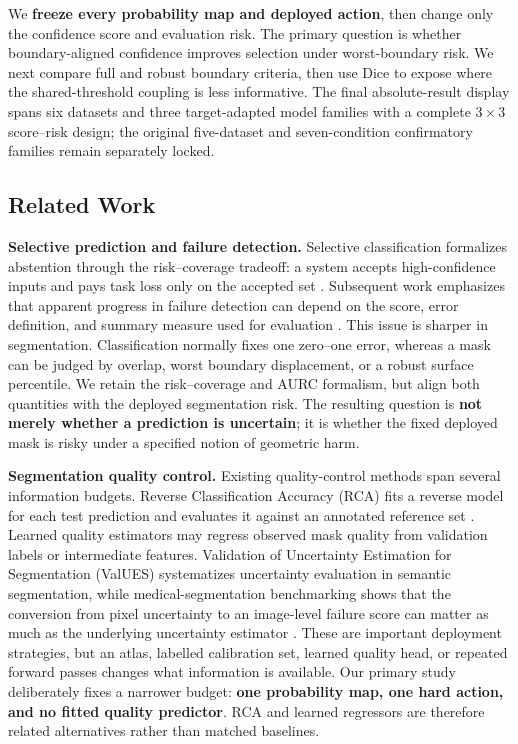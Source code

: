 We \textbf{freeze every probability map and deployed action}, then change only
the confidence score and evaluation risk. The primary question is whether
boundary-aligned confidence improves selection under worst-boundary risk. We
next compare full and robust boundary criteria, then use Dice to expose where
the shared-threshold coupling is less informative. The final absolute-result
display spans six datasets and three target-adapted model families with a
complete \(3\times3\) score--risk design; the original five-dataset and
seven-condition confirmatory families remain separately locked.

\subsection{Related Work}
\label{sec:related}

\noindent\textbf{Selective prediction and failure detection.}
Selective classification formalizes abstention through the risk--coverage
tradeoff: a system accepts high-confidence inputs and pays task loss only on the
accepted set \citep{geifman2017selective,selectivenet,feng}. Subsequent work
emphasizes that apparent progress in failure detection can depend on the score,
error definition, and summary measure used for evaluation \citep{jaeger}. This
issue is sharper in segmentation. Classification normally fixes one zero--one
error, whereas a mask can be judged by overlap, worst boundary displacement, or
a robust surface percentile. We retain the risk--coverage and AURC formalism,
but align both quantities with the deployed segmentation risk. The resulting
question is \textbf{not merely whether a prediction is uncertain}; it is whether the
fixed deployed mask is risky under a specified notion of geometric harm.

\noindent\textbf{Segmentation quality control.}
Existing quality-control methods span several information budgets. Reverse
Classification Accuracy (RCA) fits a reverse model for each test prediction and
evaluates it against an annotated reference set \citep{valindria2017rca}.
Learned quality estimators may regress observed mask quality from validation
labels or intermediate features. Validation of Uncertainty Estimation for
Segmentation (ValUES) systematizes uncertainty evaluation in
semantic segmentation, while medical-segmentation benchmarking shows that the
conversion from pixel uncertainty to an image-level failure score can matter as
much as the underlying uncertainty estimator \citep{values,zenk}. These are
important deployment strategies, but an atlas, labelled calibration set, learned
quality head, or repeated forward passes changes what information is available.
Our primary study deliberately fixes a narrower budget: \textbf{one probability map,
one hard action, and no fitted quality predictor}. RCA and learned regressors are
therefore related alternatives rather than matched baselines.

